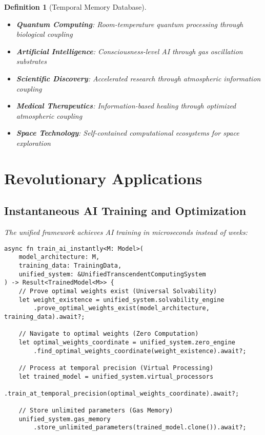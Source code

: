 \documentclass[12pt]{article}
\newtheorem{definition}[theorem]{Definition}
\begin{document}
\begin{definition}[Temporal Memory Database]
\begin{itemize}
\item \textbf{Quantum Computing}: Room-temperature quantum processing through biological coupling
\item \textbf{Artificial Intelligence}: Consciousness-level AI through gas oscillation substrates
\item \textbf{Scientific Discovery}: Accelerated research through atmospheric information coupling
\item \textbf{Medical Therapeutics}: Information-based healing through optimized atmospheric coupling
\item \textbf{Space Technology}: Self-contained computational ecosystems for space exploration
\end{itemize}

\section{Revolutionary Applications}

\subsection{Instantaneous AI Training and Optimization}

The unified framework achieves AI training in microseconds instead of weeks:

\begin{lstlisting}[caption=Instantaneous AI Training System]
async fn train_ai_instantly<M: Model>(
    model_architecture: M,
    training_data: TrainingData,
    unified_system: &UnifiedTranscendentComputingSystem
) -> Result<TrainedModel<M>> {
    // Prove optimal weights exist (Universal Solvability)
    let weight_existence = unified_system.solvability_engine
        .prove_optimal_weights_exist(model_architecture, training_data).await?;
    
    // Navigate to optimal weights (Zero Computation)
    let optimal_weights_coordinate = unified_system.zero_engine
        .find_optimal_weights_coordinate(weight_existence).await?;
    
    // Process at temporal precision (Virtual Processing)
    let trained_model = unified_system.virtual_processors
        .train_at_temporal_precision(optimal_weights_coordinate).await?;
    
    // Store unlimited parameters (Gas Memory)
    unified_system.gas_memory
        .store_unlimited_parameters(trained_model.clone()).await?;
    

\end{lstlisting}
\end{definition}
\end{document}
